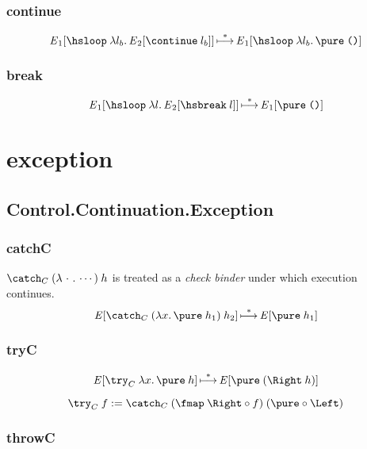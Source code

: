 \documentclass{report}
\begin{document}
\subsection{continue}

\[
  {\E}_1 \sq{ \hsloop \app \lam {l_b} {{\E}_2 \sq{\continue \app l_b}} }
    \step^*
  {\E}_1 \sq{\hsloop \app \lam {l_b} {\pure \app \unit}}
\]

\subsection{break}

\[
  {\E}_1 \sq{ \hsloop \app \lam l {{\E}_2 \sq{\hsbreak \app l}} }
    \step^*
  {\E}_1 \sq{\pure \app \unit}
\]


\chapter{exception} %

\section{Control.Continuation.Exception}

\subsection{catchC}

\( \catch_C \app \br{\lam {\p\p\cdot\p\p} \cdots} \app h \) is treated as a \emph{check binder} under which execution continues. \[
  {\E} \sq{\catch_C \app \br{\lam x {\pure \app h_1}} \app h_2}
    \step^*
  {\E} \sq{\pure \app h_1}
\]

\subsection{tryC}

\[
  {\E} \sq{\try_C \app \lam x {\pure \app h}}
    \step^*
  {\E} \sq{\pure \app \br{\Right \app h}}
\]

\[
  \try_C \app f
    := \catch_C \app \br{\fmap \app \Right \comp f}
                \app \br{\pure \comp \Left}
\]

\subsection{throwC}
\end{document}
